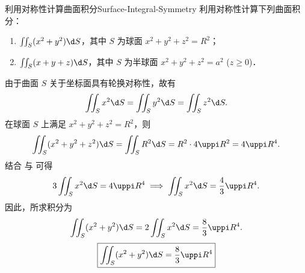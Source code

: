 \begin{problem}{利用对称性计算曲面积分}{Surface-Integral-Symmetry}
    利用对称性计算下列曲面积分：
    \begin{enumerate}
        \item $\iint_{S} (x^2 + y^2) \d S$，其中 $S$ 为球面 $x^2 + y^2 + z^2 = R^2$；
        \item $\iint_{S} (x + y + z) \d S$，其中 $S$ 为半球面 $x^2 + y^2 + z^2 = a^2$ ($z \geqslant 0$)．
    \end{enumerate}
\end{problem}

\begin{solution}

    由于曲面 $S$ 关于坐标面具有轮换对称性，故有
    \begin{equation}
        \iint_{S} x^2 \d S = \iint_{S} y^2 \d S = \iint_{S} z^2 \d S. \label{eq:symmetry-1}
    \end{equation}
    在球面 $S$ 上满足 $x^2 + y^2 + z^2 = R^2$，则
    \begin{equation}
        \iint_{S} (x^2 + y^2 + z^2) \d S = \iint_{S} R^2 \d S = R^2 \cdot 4\uppi R^2 = 4\uppi R^4. \label{eq:total-integral}
    \end{equation}
    结合  与  可得
    \begin{equation}
        3 \iint_{S} x^2 \d S = 4\uppi R^4 \implies \iint_{S} x^2 \d S = \frac{4}{3}\uppi R^4.
    \end{equation}
    因此，所求积分为
    \begin{equation}
        \iint_{S} (x^2 + y^2) \d S = 2 \iint_{S} x^2 \d S = \frac{8}{3}\uppi R^4.
    \end{equation}
    \begin{equation}
        \boxed{\iint_{S} (x^2 + y^2) \d S = \frac{8}{3}\uppi R^4}
    \end{equation}



\end{solution}
